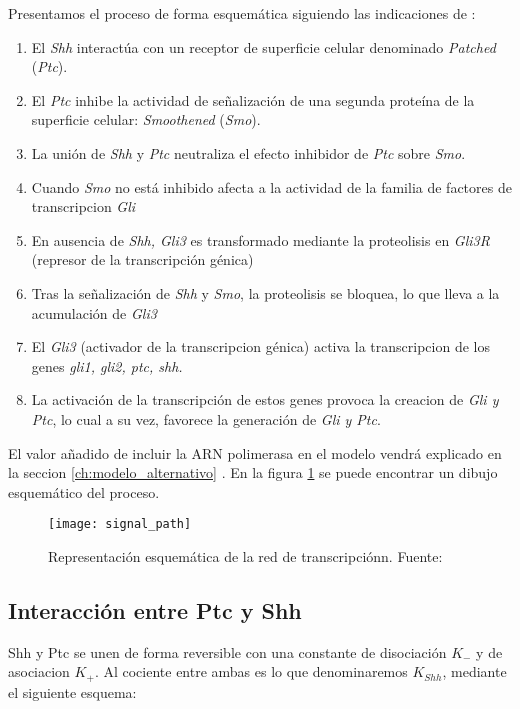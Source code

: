  
 
 
 Presentamos el proceso de forma esquemática siguiendo las  indicaciones de \cite{schaffer}:
 \begin{enumerate}
 	\item El \textit{Shh} interactúa con un receptor de superficie celular denominado \textit{Patched }(\textit{Ptc}).
 	\item El \textit{Ptc} inhibe la actividad de señalización de una segunda proteína de la superficie celular: \textit{Smoothened }(\textit{Smo}).
 	\item La unión de \textit{Shh} y \textit{Ptc} neutraliza el efecto inhibidor  de \textit{Ptc} sobre \textit{Smo}.
 	\item Cuando \textit{Smo} no está inhibido afecta a la actividad de la familia de factores de transcripcion \textit{Gli}
 	\item En ausencia de\textit{ Shh, Gli3} es transformado mediante la proteolisis en \textit{Gli3R} (represor de la transcripción génica)
 	\item Tras la señalización de \textit{Shh} y \textit{Smo}, la proteolisis se bloquea, lo que lleva a la acumulación de \textit{Gli3}
 	\item El \textit{Gli3} (activador de la transcripcion génica) activa la transcripcion de los genes \textit{gli1, gli2, ptc, shh.}
 	\item La activación de la transcripción de estos genes provoca la creacion de\textit{ Gli y Ptc}, lo cual a su vez, favorece la generación de \textit{Gli y Ptc}.
 \end{enumerate}
 
 El valor añadido de incluir la ARN polimerasa en el modelo vendrá explicado en la seccion \ref{ch:modelo_alternativo} .
 En la figura \ref{signal_path} se puede encontrar un dibujo esquemático del proceso.
  \begin{figure}[h]
  	\texttt{[image: signal\_path]}
  	\centering
  	\caption{Representación esquemática de la red de transcripciónn. Fuente: \cite{schaffer}}
  	\label{signal_path}
  \end{figure}
  
 
 
 \subsection{Interacción entre Ptc y Shh}
 Shh y Ptc se unen de forma reversible con una constante de disociación $K_-$ y de asociacion $K_+$. Al cociente entre ambas es lo que denominaremos $K_{Shh}$, mediante el siguiente esquema: 
 
